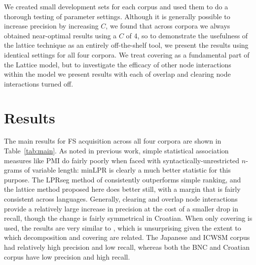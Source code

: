 \documentclass[11pt,letterpaper]{article}
\newcommand{\tabref}[2][]{Table#1~\ref{#2}\xspace}
\begin{document}


We created small development sets for each corpus and used them to do a thorough testing of parameter settings. Although it is generally possible to increase precision by increasing $C$, we found that across corpora we always obtained near-optimal results using a $C$ of 4, so to demonstrate the usefulness of the lattice technique as an entirely off-the-shelf tool, we present the results using identical settings for all four corpora. We treat covering as a fundamental part of the Lattice model, but to investigate the efficacy of other node interactions within the model we present results with each of overlap and clearing node interactions turned off.
		

\section{Results}

The main results for FS acquisition across all four corpora are shown in \tabref{tab:main}. As noted in previous work, simple statistical association measures like PMI do fairly poorly when faced with syntactically-unrestricted $n$-grams of variable length: minLPR is clearly a much better statistic for this purpose. The LPRseg method of  consistently outperforms simple ranking, and the lattice method proposed here does better still, with a margin that is fairly consistent across languages. Generally, clearing and overlap node interactions provide a relatively large increase in precision at the cost of a smaller drop in recall, though the change is fairly symmetrical in Croatian.  When only covering is used, the results are very similar to , which is unsurprising given the extent to which decomposition and covering are related. The Japanese and ICWSM corpus had relatively high precision and low recall, whereas both the BNC and Croatian corpus have low precision and high recall.
\end{document}
